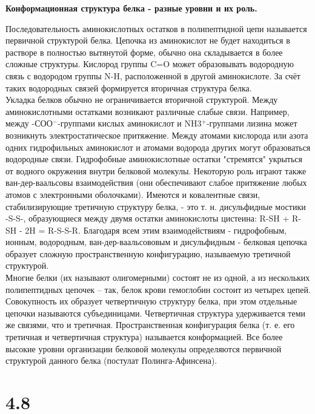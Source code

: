 \documentclass[a4paper,14pt]{article}
\begin{document}
\begin{center}
	\LARGE{\textbf{Конформационная структура белка - разные уровни и их роль.}}\\
\end{center}

Последовательность аминокислотных остатков в полипептидной цепи называется первичной структурой белка.
Цепочка из аминокислот не будет находиться в растворе в полностью вытянутой форме, обычно она складывается в более сложные структуры. Кислород группы C=O может образовывать водородную связь с водородом группы N-H, расположенной в другой аминокислоте. За счёт таких водородных связей формируется вторичная структура белка.\\
Укладка белков обычно не ограничивается вторичной структурой. Между аминокислотными остатками возникают различные слабые связи. Например, между -СОО$^-$-группами кислых аминокислот и NH3$^+$-группами лизина может возникнуть электростатическое притяжение. Между атомами кислорода или азота одних гидрофильных аминокислот и атомами водорода других могут образоваться водородные связи. Гидрофобные аминокислотные остатки "стремятся" укрыться от водного окружения внутри белковой молекулы. Некоторую роль играют также ван-дер-ваальсовы взаимодействия (они обеспечивают слабое притяжение любых атомов с электронными оболочками). Имеются и ковалентные связи, стабилизирующие третичную структуру белка, - это т. н. дисульфидные мостики -S-S-, образующиеся между двумя остатки аминокислоты цистеина: R-SH + R-SH - 2H = R-S-S-R. Благодаря всем этим взаимодействиям - гидрофобным, ионным, водородным, ван-дер-ваальсововым и дисульфидным - белковая цепочка образует сложную пространственную конфигурацию, называемую третичной структурой.\\
Многие белки (их называют олигомерными) состоят не из одной, а из нескольких полипептидных цепочек – так, белок крови гемоглобин состоит из четырех цепей. Совокупность их образует четвертичную структуру белка, при этом отдельные цепочки называются субъединицами. Четвертичная структура удерживается теми же связями, что и третичная. Пространственная конфигурация белка (т. е. его третичная и четвертичная структура) называется конформацией. Все более высокие уровни организации белковой молекулы определяются первичной структурой данного белка (постулат Полинга-Афинсена).

\section*{4.8}
\end{document}
